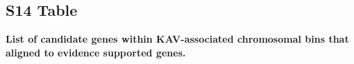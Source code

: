\documentclass[10pt,letterpaper]{article}
\begin{document}
\subsection*{S14 Table}
\label{Table_S14}
{\bf List of candidate genes within KAV-associated chromosomal bins that aligned to evidence supported genes.}
\end{document}
